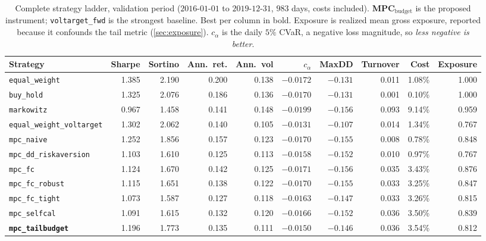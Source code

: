 \documentclass[journal]{IEEEtran}
\newcommand{\ours}[1]{\textcolor{blue!70!black}{\textbf{#1}}}
\begin{document}
\begin{table}[!t]
  \centering
  \caption{Complete strategy ladder, validation period ($2016$-$01$-$01$ to
  $2019$-$12$-$31$, $983$ days, costs included). \ours{MPC}$_{\text{budget}}$ is
  the proposed instrument; \texttt{voltarget\_fwd} is the strongest baseline.
  Best per column in bold. Exposure is realized mean gross exposure, reported
  because it confounds the tail metric (\cref{sec:exposure}). $c_\alpha$ is the
  daily $5\%$ CVaR, a negative loss magnitude, so \emph{less negative is better}.}
  \label{tab:ladder}
  \begin{tabular}{lrrrrrrrrr}
    \toprule
    Strategy & Sharpe & Sortino & Ann.\ ret. & Ann.\ vol & $c_\alpha$ &
    MaxDD & Turnover & Cost & Exposure \\
    \midrule
    \texttt{equal\_weight}              & 1.385 & 2.190 & 0.200 & 0.138 & $-0.0172$ & $-0.131$ & 0.011 & 1.08\% & 1.000 \\
    \texttt{buy\_hold}                  & 1.325 & 2.076 & 0.186 & 0.136 & $-0.0170$ & $-0.131$ & 0.001 & 0.10\% & 1.000 \\
    \texttt{markowitz}                  & 0.967 & 1.458 & 0.141 & 0.148 & $-0.0199$ & $-0.156$ & 0.093 & 9.14\% & 0.959 \\
    \texttt{equal\_weight\_voltarget}   & 1.302 & 2.062 & 0.140 & 0.105 & $-0.0131$ & $-0.107$ & 0.014 & 1.34\% & 0.767 \\
    \texttt{mpc\_naive}                 & 1.252 & 1.856 & 0.157 & 0.123 & $-0.0170$ & $-0.155$ & 0.008 & 0.78\% & 0.848 \\
    \texttt{mpc\_dd\_riskaversion}      & 1.103 & 1.610 & 0.125 & 0.113 & $-0.0158$ & $-0.152$ & 0.010 & 0.97\% & 0.767 \\
    \texttt{mpc\_fc}                    & 1.124 & 1.670 & 0.142 & 0.125 & $-0.0171$ & $-0.156$ & 0.035 & 3.43\% & 0.876 \\
    \texttt{mpc\_fc\_robust}            & 1.115 & 1.651 & 0.138 & 0.122 & $-0.0170$ & $-0.155$ & 0.033 & 3.25\% & 0.847 \\
    \texttt{mpc\_fc\_tight}             & 1.073 & 1.587 & 0.127 & 0.118 & $-0.0163$ & $-0.147$ & 0.033 & 3.26\% & 0.815 \\
    \texttt{mpc\_selfcal}               & 1.091 & 1.615 & 0.132 & 0.120 & $-0.0166$ & $-0.152$ & 0.036 & 3.50\% & 0.839 \\
    \midrule
    \ours{\texttt{mpc\_tailbudget}}         & 1.196 & 1.773 & 0.135 & 0.111 & $-0.0150$ & $-0.146$ & 0.036 & 3.54\% & 0.812 \\

\end{tabular}
\end{table}
\end{document}
